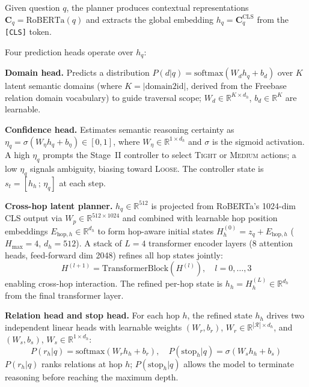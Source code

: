 \documentclass[10pt,conference]{IEEEtran}
\begin{document}
Given question $q$, the planner produces contextual representations $\mathbf{C}_q = \text{RoBERTa}(q)$ and extracts the global embedding $h_q = \mathbf{C}_q^{\text{CLS}}$ from the \texttt{[CLS]} token.

Four prediction heads operate over $h_q$:

\textbf{Domain head.} Predicts a distribution $P(d|q) = \text{softmax}(W_d h_q + b_d)$ over $K$ latent semantic domains (where $K=|\text{domain2id}|$, derived from the Freebase relation domain vocabulary) to guide traversal scope; $W_d \in \mathbb{R}^{K \times d_h}$, $b_d \in \mathbb{R}^{K}$ are learnable.

\textbf{Confidence head.} Estimates semantic reasoning certainty as $\eta_q = \sigma(W_\eta h_q + b_\eta) \in [0,1]$, where $W_\eta \in \mathbb{R}^{1 \times d_h}$ and $\sigma$ is the sigmoid activation. A high $\eta_q$ prompts the Stage~II controller to select \textsc{Tight} or \textsc{Medium} actions; a low $\eta_q$ signals ambiguity, biasing toward \textsc{Loose}. The controller state is $s_t = [h_h \,;\, \eta_q]$ at each step.

\textbf{Cross-hop latent planner.} $h_q \in \mathbb{R}^{512}$ is projected from RoBERTa's 1024-dim CLS output via $W_p \in \mathbb{R}^{512 \times 1024}$ and combined with learnable hop position embeddings $E_{\text{hop},h} \in \mathbb{R}^{d_h}$ to form hop-aware initial states $H^{(0)}_h = z_q + E_{\text{hop},h}$ ($H_{\max}=4$, $d_h=512$). A stack of $L=4$ transformer encoder layers (8 attention heads, feed-forward dim 2048) refines all hop states jointly:
\begin{equation}
H^{(l+1)} = \text{TransformerBlock}(H^{(l)}), \quad l = 0,\dots,3
\end{equation}
enabling cross-hop interaction. The refined per-hop state is $h_h = H^{(L)}_h \in \mathbb{R}^{d_h}$ from the final transformer layer.

\textbf{Relation head and stop head.} For each hop $h$, the refined state $h_h$ drives two independent linear heads with learnable weights $(W_r, b_r)$, $W_r \in \mathbb{R}^{|\mathcal{R}| \times d_h}$, and $(W_s, b_s)$, $W_s \in \mathbb{R}^{1 \times d_h}$:
\begin{equation}
P(r_h|q) = \text{softmax}(W_r h_h + b_r), \quad P(\text{stop}_h|q) = \sigma(W_s h_h + b_s)
\end{equation}
$P(r_h|q)$ ranks relations at hop $h$; $P(\text{stop}_h|q)$ allows the model to terminate reasoning before reaching the maximum depth.
\end{document}
